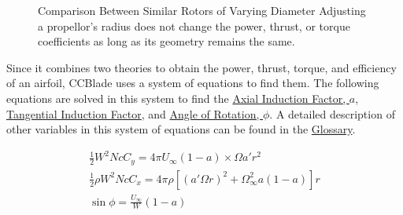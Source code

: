 \documentclass{article}
\begin{document}
\begin{figure}
  \label{fig:1}
  \centering
  \caption{Comparison Between Similar Rotors of Varying Diameter \newline Adjusting a propellor's radius does not change the power, thrust, or torque coefficients as long as its geometry remains the same.}
\end{figure}

Since it combines two theories to obtain the power, thrust, torque, and efficiency of an airfoil, CCBlade uses a system of equations to find them. The following equations are solved in this system to find the  \hyperlink{a}{Axial Induction Factor, $a$}, \hyperlink{a'}{Tangential Induction Factor}, and \hyperlink{phi}{Angle of Rotation, $\phi$}. A detailed description of other variables in this system of equations can be found in the \hyperlink{BEM}{Glossary}. \newline

\begin{equation}
\begin{aligned}
	\frac{1}{2} W^{2} N c C_{y} = 4 \pi U_{\infty} (1 - a) \times \Omega a' r^{2} \\
	\frac{1}{2} \rho W^{2} N c C_{x} = 4 \pi \rho [(a' \Omega r)^{2} + \Omega^{2}_{\infty} a (1 - a)] r \\
	\sin \phi = \frac{U_{\infty}}{W} (1 - a)
\end{aligned}
\end{equation}
\end{document}
